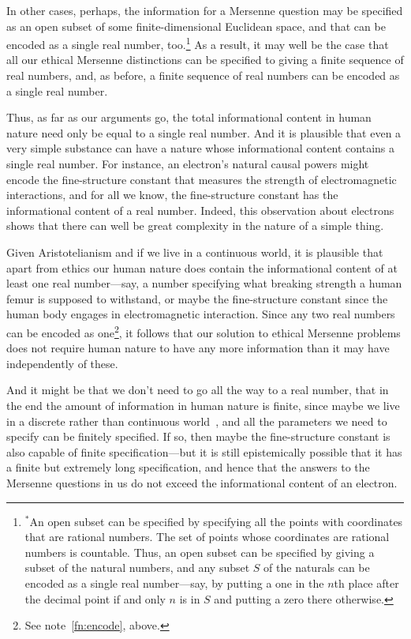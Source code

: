  In other cases, perhaps, the information for a Mersenne question may be specified as an open subset of
some finite-dimensional Euclidean space, and that can be encoded as a single real number, too.\footnote{$^*$An open subset
can be specified by specifying all the points with coordinates that are rational numbers. The set of points whose
coordinates are rational numbers is countable. Thus, an open subset can be specified by giving a subset of the natural
numbers, and any subset $S$ of the naturals can be encoded as a single real number---say, by putting a one in the
$n$th place after the decimal point if and only $n$ is in $S$ and putting a zero there otherwise.} As a result, it
may well be the case that all our ethical Mersenne distinctions can be specified to giving a finite sequence of 
real numbers, and, as before, a finite sequence of real numbers can be encoded as a single real number. 

Thus, as far as our arguments go, the total informational content in human nature need only be equal to a single real number. And it is plausible that even a very simple substance can have a nature whose informational content contains a 
single real number. For instance, an electron's natural causal powers might encode the fine-structure constant 
that measures the strength of electromagnetic interactions, and for all we know, the fine-structure constant has
the informational content of a real number. Indeed, this observation about electrons shows
that there can well be great complexity in the nature of a simple thing.

Given Aristotelianism and if we live in a continuous world, it is plausible that apart from ethics our 
human nature does contain the informational content of at least one real number---say, a number specifying 
what breaking strength a human femur is supposed to withstand, or maybe the fine-structure constant since the human
body engages in electromagnetic interaction. Since any two real numbers can be encoded as one\footnote{See note~\ref{fn:encode}, above.}, it follows that
our solution to ethical Mersenne problems does not require human nature to have any more information than it 
may have independently of these. 

And it might be that we don't need to go all the way to a real number, that in the end the amount of information in
human nature is finite, since maybe we live in a discrete rather than continuous world~, and
all the parameters we need to specify can be finitely specified. If so, then maybe the fine-structure constant is also
capable of finite specification---but it is still epistemically possible that it has a finite but extremely long specification, and hence that the answers to the Mersenne questions in us do not exceed the informational content
of an electron.

